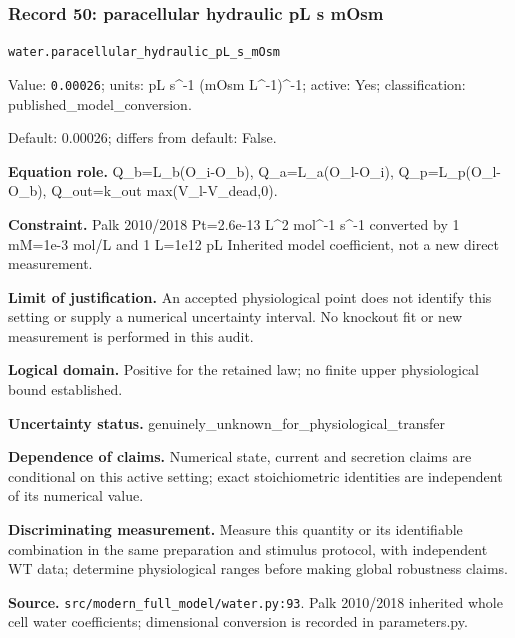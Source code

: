 \subsubsection*{Record 50: paracellular hydraulic pL s mOsm}
{\small \nolinkurl{water.paracellular_hydraulic_pL_s_mOsm}\par

Value: \texttt{0.00026}; units: pL s\textasciicircum{}-1 (mOsm L\textasciicircum{}-1)\textasciicircum{}-1; active: Yes; classification: published\_model\_conversion.\par

Default: 0.00026; differs from default: False.\par

\textbf{Equation role.} Q\_b=L\_b(O\_i-O\_b), Q\_a=L\_a(O\_l-O\_i), Q\_p=L\_p(O\_l-O\_b), Q\_out=k\_out max(V\_l-V\_dead,0).\par

\textbf{Constraint.} Palk 2010/2018 Pt=2.6e-13 L\textasciicircum{}2 mol\textasciicircum{}-1 s\textasciicircum{}-1 converted by 1 mM=1e-3 mol/L and 1 L=1e12 pL Inherited model coefficient, not a new direct measurement.\par

\textbf{Limit of justification.} An accepted physiological point does not identify this setting or supply a numerical uncertainty interval. No knockout fit or new measurement is performed in this audit.\par

\textbf{Logical domain.} Positive for the retained law; no finite upper physiological bound established.\par

\textbf{Uncertainty status.} genuinely\_unknown\_for\_physiological\_transfer\par

\textbf{Dependence of claims.} Numerical state, current and secretion claims are conditional on this active setting; exact stoichiometric identities are independent of its numerical value.\par

\textbf{Discriminating measurement.} Measure this quantity or its identifiable combination in the same preparation and stimulus protocol, with independent WT data; determine physiological ranges before making global robustness claims.\par

\textbf{Source.} \nolinkurl{src/modern_full_model/water.py:93}. Palk 2010/2018 inherited whole cell water coefficients; dimensional conversion is recorded in parameters.py.\par}

